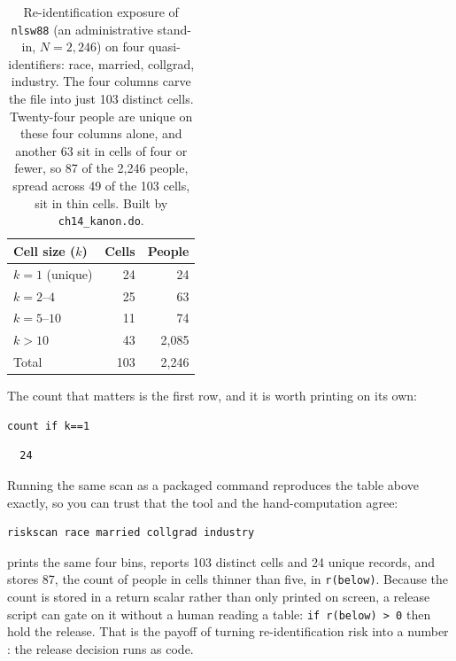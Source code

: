 \documentclass[
    a4paper,
    fontsize=10pt,
    twoside=true,
    numbers=noenddot,
]{kaobook}
\begin{document}
\begin{table}[htbp]
\centering
{\footnotesize
\begin{tabular}{lrr}
\hline
Cell size ($k$) & Cells & People \\
\hline
$k=1$ (unique)   &  24 &    24 \\
$k=2$--$4$        &  25 &    63 \\
$k=5$--$10$       &  11 &    74 \\
$k>10$            &  43 & 2{,}085 \\
\hline
Total            & 103 & 2{,}246 \\
\hline
\end{tabular}
}
\caption[$k$-anonymity of four ordinary columns]{Re-identification exposure of \texttt{nlsw88} (an administrative stand-in, $N=2{,}246$) on four quasi-identifiers: race, married, collgrad, industry. The four columns carve the file into just 103 distinct cells. Twenty-four people are unique on these four columns alone, and another 63 sit in cells of four or fewer, so 87 of the 2{,}246 people, spread across 49 of the 103 cells, sit in thin cells. Built by \texttt{ch14\_kanon.do}.}
\label{tab:kanon}
\end{table}

The count that matters is the first row, and it is worth printing on its own:
\par
{\footnotesize
\begin{verbatim}
count if k==1
\end{verbatim}
}
\par
{\footnotesize
\begin{verbatim}
  24
\end{verbatim}
}
Running the same scan as a packaged command reproduces the table above exactly, so you can trust that the tool and the hand-computation agree:
\par
{\footnotesize
\begin{verbatim}
riskscan race married collgrad industry
\end{verbatim}
}
prints the same four bins, reports 103 distinct cells and 24 unique records, and stores 87, the count of people in cells thinner than five, in \texttt{r(below)}. Because the count is stored in a return scalar rather than only printed on screen, a release script can gate on it without a human reading a table: \texttt{if r(below) > 0} then hold the release. That is the payoff of turning re-identification risk into a number \parencite{elemam2008kanon}: the release decision runs as code.
\end{document}
